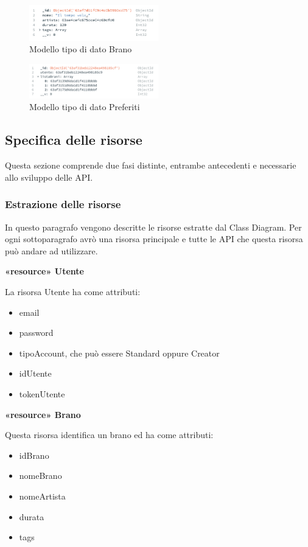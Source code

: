 \documentclass[a4paper,12pt]{article}
\begin{document}
\begin{figure}[htp]
    \centering
    \includegraphics[width=0.5\textwidth]{code/modello-brano.png}
    \caption{Modello tipo di dato Brano}
\end{figure}

\begin{figure}[htp]
    \centering
    \includegraphics[width=0.5\textwidth]{code/modello-preferiti.png}
    \caption{Modello tipo di dato Preferiti}
\end{figure}

\subsection{Specifica delle risorse}

Questa sezione comprende due fasi distinte, entrambe antecedenti e necessarie allo sviluppo delle API.

\subsubsection{Estrazione delle risorse}

In questo paragrafo vengono descritte le risorse estratte dal Class Diagram. Per ogni sottoparagrafo avrò una risorsa principale e tutte le API che questa risorsa può andare ad utilizzare.

\textbf{«resource» Utente}

La risorsa Utente ha come attributi:
\begin{itemize}
    \item email
    \item password
    \item tipoAccount, che può essere Standard oppure Creator
    \item idUtente
    \item tokenUtente
\end{itemize}

\textbf{«resource» Brano}

Questa risorsa identifica un brano ed ha come attributi:
\begin{itemize}
    \item idBrano 
    \item nomeBrano 
    \item nomeArtista 
    \item durata
    \item tags
\end{itemize}
\end{document}
